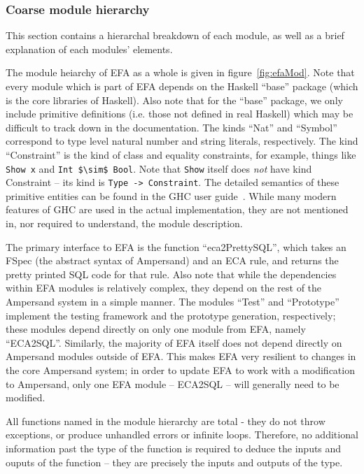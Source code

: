 \documentclass[12pt, svgnames]{article}
\let\Oldsubsubsection\subsubsection
\renewcommand{\subsubsection}{\FloatBarrier\Oldsubsubsection}
\begin{document}
\Oldsubsubsection{Coarse module hierarchy}

This section contains a hierarchal breakdown of each module, as well as a brief
explanation of each modules' elements. 

The module heiarchy of EFA as a whole is given in figure~\ref{fig:efaMod}.  Note
that every module which is part of EFA depends on the Haskell ``base'' package
(which is the core libraries of Haskell). Also note that for the ``base''
package, we only include primitive definitions (i.e. those not defined in real
Haskell) which may be difficult to track down in the documentation. The kinds
``Nat'' and ``Symbol'' correspond to type level natural number and string
literals, respectively. The kind ``Constraint'' is the kind of class and
equality constraints, for example, things like \lstinline{Show x} and \lstinline[mathescape]|Int $\sim$ Bool|.  
Note that \texttt{Show} itself does \emph{not} have kind Constraint --
its kind is \lstinline{Type -> Constraint}. The detailed semantics of these
primitive entities can be found in the GHC user guide~\cite{ghcUserGuide}. While
many modern features of GHC are used in the actual implementation, they are not
mentioned in, nor required to understand, the module description.

The primary interface to EFA is the function ``eca2PrettySQL'', which takes an
FSpec (the abstract syntax of Ampersand) and an ECA rule, and returns the pretty
printed SQL code for that rule. Also note that while the dependencies within EFA
modules is relatively complex, they depend on the rest of the Ampersand system
in a simple manner. The modules ``Test'' and ``Prototype'' implement the testing
framework and the prototype generation, respectively; these modules depend
directly on only one module from EFA, namely ``ECA2SQL''. Similarly, the
majority of EFA itself does not depend directly on Ampersand modules outside of
EFA. This makes EFA very resilient to changes in the core Ampersand system; in
order to update EFA to work with a modification to Ampersand, only one EFA
module -- ECA2SQL -- will generally need to be modified. 

All functions named in the module hierarchy are total - they do not throw
exceptions, or produce unhandled errors or infinite loops. Therefore, no
additional information past the type of the function is required to deduce the
inputs and ouputs of the function -- they are precisely the inputs and outputs
of the type.
\end{document}

